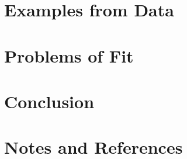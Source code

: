 \documentclass{article}
\begin{document}
    \section{Examples from Data}

    \section{Problems of Fit}

    \section{Conclusion}

    \section{Notes and References}
    
\end{document}
